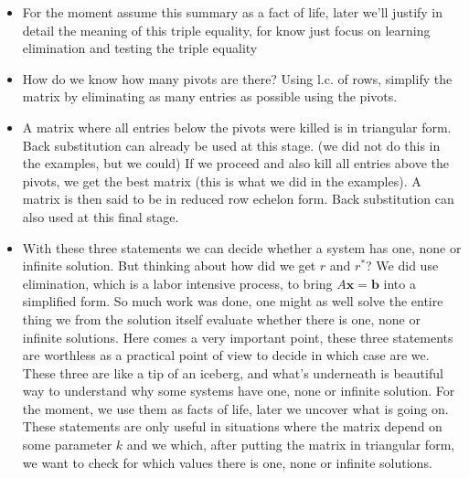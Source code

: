 \documentclass[
  letterpaper,
  DIV=11,
  numbers=noendperiod]{scrartcl}
\theoremstyle{definition}
\theoremstyle{remark}
\begin{document}
\begin{tcolorbox}[enhanced jigsaw, colback=white, breakable, toptitle=1mm, left=2mm, bottomtitle=1mm, opacitybacktitle=0.6, rightrule=.15mm, title=\textcolor{quarto-callout-note-color}{\faInfo}\hspace{0.5em}{Commentaries}, arc=.35mm, toprule=.15mm, opacityback=0, colframe=quarto-callout-note-color-frame, colbacktitle=quarto-callout-note-color!10!white, leftrule=.75mm, titlerule=0mm, coltitle=black, bottomrule=.15mm]

\begin{itemize}
\item
  For the moment assume this summary as a fact of life, later we'll
  justify in detail the meaning of this triple equality, for know just
  focus on learning elimination and testing the triple equality
\item
  How do we know how many pivots are there? Using l.c. of rows, simplify
  the matrix by eliminating as many entries as possible using the
  pivots.
\item
  A matrix where all entries below the pivots were killed is in
  triangular form. Back substitution can already be used at this stage.
  (we did not do this in the examples, but we could) If we proceed and
  also kill all entries above the pivots, we get the best matrix (this
  is what we did in the examples). A matrix is then said to be in
  reduced row echelon form. Back substitution can also used at this
  final stage.
\item
  With these three statements we can decide whether a system has one,
  none or infinite solution. But thinking about how did we get \(r\) and
  \(r^*\)? We did use elimination, which is a labor intensive process,
  to bring \(A\mathbf{x}=\mathbf{b}\) into a simplified form. So much
  work was done, one might as well solve the entire thing we from the
  solution itself evaluate whether there is one, none or infinite
  solutions. Here comes a very important point, these three statements
  are worthless as a practical point of view to decide in which case are
  we. These three are like a tip of an iceberg, and what's underneath is
  beautiful way to understand why some systems have one, none or
  infinite solution. For the moment, we use them as facts of life, later
  we uncover what is going on. These statements are only useful in
  situations where the matrix depend on some parameter \(k\) and we
  which, after putting the matrix in triangular form, we want to check
  for which values there is one, none or infinite solutions.
\end{itemize}

\end{tcolorbox}
\end{document}
